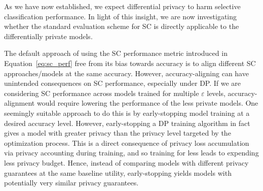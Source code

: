 As we have now established, we expect differential privacy to harm selective classification performance. %
In light of this insight, we are now investigating whether the standard evaluation scheme for SC is directly applicable to the differentially private models. %


The default approach of using the SC performance metric introduced in Equation~\ref{eq:sc_perf} free from its bias towards accuracy is to align different SC approaches/models at the same accuracy. However, accuracy-aligning can have unintended consequences on SC performance, especially under DP. If we are considering SC performance across models trained for multiple $\varepsilon$ levels, accuracy-alignment would require lowering the performance of the less private models. One seemingly suitable approach to do this is by early-stopping model training at a desired accuracy level. However, early-stopping a DP training algorithm in fact gives a model with greater privacy than the privacy level targeted by the optimization process. This is a direct consequence of privacy loss accumulation via privacy accounting during training, and so training for less leads to expending less privacy budget. Hence, instead of comparing models with different privacy guarantees at the same baseline utility, early-stopping yields models with potentially very similar privacy guarantees. 




